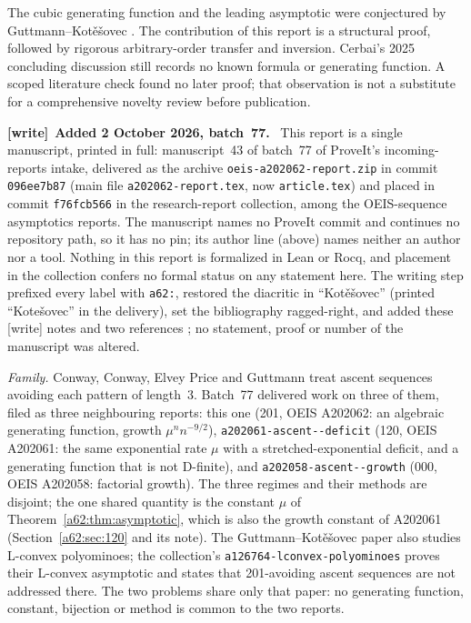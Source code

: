 \documentclass[11pt,letterpaper]{article}
\theoremstyle{remark}\newtheorem{remark}[theorem]{Remark}
\newenvironment{writenote}[1][]{\par\smallskip\begingroup\small
 \noindent\textbf{[write]}\if\relax\detokenize{#1}\relax\else~\textbf{#1.}\fi\ }%
 {\par\endgroup\smallskip}
\begin{document}
The cubic generating function and the leading asymptotic were conjectured by Guttmann--Kot\v{e}\v{s}ovec \cite{GK}. The contribution of this report is a structural proof, followed by rigorous arbitrary-order transfer and inversion. Cerbai's 2025 concluding discussion \cite{Cerbai} still records no known formula or generating function. A scoped literature check found no later proof; that observation is not a substitute for a comprehensive novelty review before publication.

\begin{writenote}[Added 2 October 2026, batch~77]
This report is a single manuscript, printed in full: manuscript~43 of
batch~77 of ProveIt's incoming-reports intake, delivered as the archive
\texttt{oeis-\allowbreak a202062-\allowbreak report.zip} in commit
\texttt{096ee7b87} (main file \texttt{a202062-report.tex}, now
\texttt{article.tex}) and placed in commit \texttt{f76fcb566} in the
research-report collection, among the OEIS-sequence asymptotics reports.
The manuscript names no ProveIt commit and continues no repository path, so
it has no pin; its author line (above) names neither an author nor a tool.
Nothing in this report is formalized in Lean or Rocq, and placement in the
collection confers no formal status on any statement here. The writing step
prefixed every label with \texttt{a62:}, restored the diacritic in
``Kot\v{e}\v{s}ovec'' (printed ``Kote\v{s}ovec'' in the delivery), set the
bibliography ragged-right, and added these \textsf{[write]} notes and two
references \cite{a62-tai,a62-a61}; no statement, proof or number of the
manuscript was altered.

\emph{Family.} Conway, Conway, Elvey Price and Guttmann \cite{Conway}
treat ascent sequences avoiding each pattern of length~3. Batch~77
delivered work on three of them, filed as three neighbouring reports:
this one (201, OEIS A202062: an algebraic generating function, growth
$\mu^nn^{-9/2}$), \texttt{a202061-\allowbreak ascent--\allowbreak deficit}
\cite{a62-a61} (120, OEIS A202061: the same exponential rate $\mu$ with a
stretched-exponential deficit, and a generating function that is not
D-finite), and \texttt{a202058-\allowbreak ascent--\allowbreak growth}
(000, OEIS A202058: factorial growth). The three regimes and their methods
are disjoint; the one shared quantity is the constant $\mu$ of
Theorem~\ref{a62:thm:asymptotic}, which is also the growth constant of
A202061 (Section~\ref{a62:sec:120} and its note). The Guttmann--Kot\v{e}\v{s}ovec paper
\cite{GK} also studies L-convex polyominoes; the collection's
\texttt{a126764-\allowbreak lconvex-\allowbreak polyominoes} proves their
L-convex asymptotic and states that 201-avoiding ascent sequences are not
addressed there. The two problems share only that paper: no generating
function, constant, bijection or method is common to the two reports.


\end{writenote}
\end{document}
